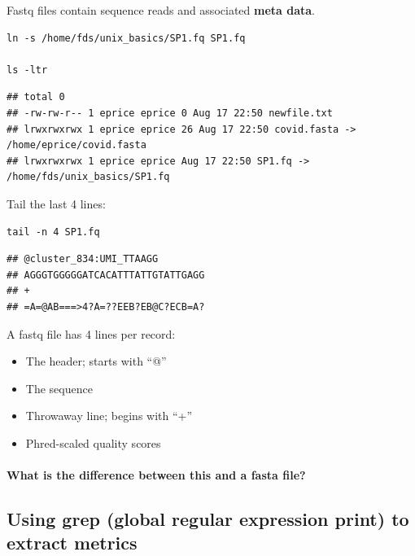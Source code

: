 \documentclass[
]{book}
\providecommand{\tightlist}{%
  \setlength{\itemsep}{0pt}\setlength{\parskip}{0pt}}
\begin{document}
Fastq files contain sequence reads and associated \textbf{meta data}.

\begin{verbatim}
ln -s /home/fds/unix_basics/SP1.fq SP1.fq

ls -ltr
\end{verbatim}

\begin{verbatim}
## total 0
## -rw-rw-r-- 1 eprice eprice 0 Aug 17 22:50 newfile.txt
## lrwxrwxrwx 1 eprice eprice 26 Aug 17 22:50 covid.fasta -> /home/eprice/covid.fasta 
## lrwxrwxrwx 1 eprice eprice Aug 17 22:50 SP1.fq -> /home/fds/unix_basics/SP1.fq
\end{verbatim}

Tail the last 4 lines:

\begin{verbatim}
tail -n 4 SP1.fq
\end{verbatim}

\begin{verbatim}
## @cluster_834:UMI_TTAAGG
## AGGGTGGGGGATCACATTTATTGTATTGAGG 
## +
## =A=@AB===>4?A=??EEB?EB@C?ECB=A?
\end{verbatim}

A fastq file has 4 lines per record:

\begin{itemize}
\tightlist
\item
  The header; starts with ``@''
\item
  The sequence
\item
  Throwaway line; begins with ``+''
\item
  Phred-scaled quality scores
\end{itemize}

\hypertarget{what-is-the-difference-between-this-and-a-fasta-file}{%
\paragraph*{What is the difference between this and a fasta file?}\label{what-is-the-difference-between-this-and-a-fasta-file}}

\hypertarget{using-grep-global-regular-expression-print-to-extract-metrics}{%
\subsection{Using grep (global regular expression print) to extract metrics}\label{using-grep-global-regular-expression-print-to-extract-metrics}}
\end{document}
